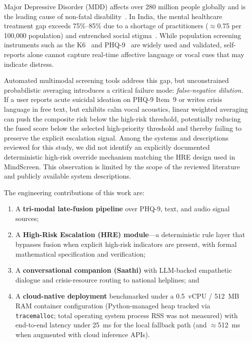 \documentclass[10pt, conference, letterpaper]{IEEEtran}
\begin{document}
Major Depressive Disorder (MDD) affects over 280 million people globally and
is the leading cause of non-fatal disability~\cite{who2023}.
In India, the mental healthcare treatment gap exceeds 75\%--85\% due to a
shortage of practitioners ($\approx$0.75 per 100{,}000 population) and
entrenched social stigma~\cite{gururaj2016}.
While population screening instruments such as the K6~\cite{kessler2003} and
PHQ-9~\cite{kroenke2001} are widely used and validated, self-reports alone
cannot capture real-time affective language or vocal cues that may indicate distress.

Automated multimodal screening tools address this gap, but unconstrained
probabilistic averaging introduces a critical failure mode:
\textit{false-negative dilution}.
If a user reports acute suicidal ideation on PHQ-9 Item~9 or writes crisis
language in free text, but exhibits calm vocal acoustics, linear weighted
averaging can push the composite risk below the high-risk threshold,
potentially reducing the fused score below the selected high-priority
threshold and thereby failing to preserve the explicit escalation signal.
Among the systems and descriptions reviewed for this study, we did not identify
an explicitly documented deterministic high-risk override mechanism matching
the HRE design used in MindScreen. This observation is limited by the scope of
the reviewed literature and publicly available system descriptions.

The engineering contributions of this work are:
\begin{enumerate}
  \item A \textbf{tri-modal late-fusion pipeline} over PHQ-9, text, and
    audio signal sources;
  \item A \textbf{High-Risk Escalation (HRE) module}---a deterministic
    rule layer that bypasses fusion when explicit high-risk indicators are
    present, with formal mathematical specification and verification;
  \item A \textbf{conversational companion (Saathi)} with LLM-backed
    empathetic dialogue and crisis-resource routing to national helplines; and
  \item A \textbf{cloud-native deployment} benchmarked under a 0.5~vCPU
    / 512~MB RAM container configuration (Python-managed heap tracked via
    \texttt{tracemalloc}; total operating system process RSS was not measured)
    with end-to-end latency under 25~ms for the local fallback path (and
    $\approx$512~ms when augmented with cloud inference APIs).
\end{enumerate}
\end{document}
